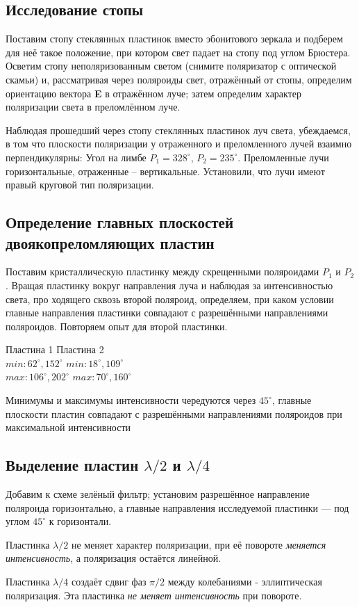\subsection{Исследование стопы}

\begin{figure}[h!]
	  \center{\texttt{[image: 6]}}
\end{figure}

Поставим стопу стеклянных пластинок вместо эбонитового зеркала
и подберем для неё такое положение, при
котором свет падает на стопу под углом Брюстера.
Осветим стопу неполяризованным светом (снимите поляризатор с оптической скамьи) и, рассматривая через поляроиды свет, отражённый от стопы, определим ориентацию вектора
\textbf{E} в отражённом луче; затем определим
характер поляризации света в преломлённом луче. 
\par Наблюдая прошедший через стопу стеклянных пластинок луч света, убеждаемся, в
том что плоскости поляризации у отраженного и преломленного лучей взаимно
перпендикулярны: Угол на лимбе $P_1 = 328^{\circ}$, $P_2 = 235^{\circ}$. Преломленные лучи горизонтальные, отраженные – вертикальные. Установили, что лучи имеют правый
круговой тип поляризации. 

\subsection{Определение главных плоскостей двоякопреломляющих пластин}
Поставим кристаллическую пластинку
между скрещенными поляроидами $P_1$ и $P_2$. Вращая пластинку вокруг направления луча
и наблюдая за интенсивностью света, про
ходящего сквозь второй поляроид, определяем, при
каком условии главные направления пластинки
совпадают с разрешёнными направлениями поляроидов. Повторяем опыт для второй пластинки.

\begin{center}
    Пластина 1 \hspace{1cm} Пластина 2 \\
    $min: 62^{\circ}, 152^{\circ}$ \hspace {1cm} $min: 18^{\circ}, 109^{\circ}$ \\
     $max: 106^{\circ}, 202^{\circ}$ \hspace {1cm} $max: 70^{\circ}, 160^{\circ}$
\end{center}
Минимумы и максимумы интенсивности чередуются через $45^{\circ}$, главные плоскости пластин совпадают с разрешёнными направлениями поляроидов при максимальной интенсивности

\subsection{Выделение пластин $\lambda/2$ и $\lambda/4$}
Добавим к схеме зелёный фильтр; установим
разрешённое направление поляроида горизонтально, а главные направления исследуемой пластинки — под углом $45^{\circ}$ к горизонтали. 
\par Пластинка $\lambda/2$ не меняет характер поляризации, при её повороте \textit{меняется интенсивность}, а поляризация остаётся линейной. 
\par Пластинка $\lambda/4$ создаёт сдвиг фаз $\pi/2$ между колебаниями - эллиптическая поляризация. Эта пластинка \textit{не меняет интенсивность} при повороте.


